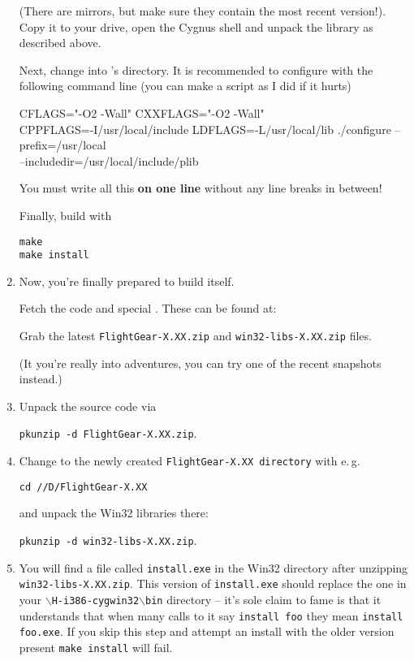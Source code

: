 \begin{enumerate}

(There are mirrors, but make sure they contain the most recent version!). Copy it to your
\FlightGear drive, open the Cygnus shell and unpack the library as described above.

Next, change into 's directory. It is recommended to configure 
with the following command line (you can make a script as I did if it hurts)

\begin{ttfamily}
CFLAGS="-O2 -Wall" CXXFLAGS="-O2 -Wall"\\ CPPFLAGS=-I/usr/local/include
LDFLAGS=-L/usr/local/lib ./configure
--prefix=/usr/local\\
 --includedir=/usr/local/include/plib
\end{ttfamily}

You must write all this \textbf{on one line} without any line breaks in between!

Finally, build  with

 \texttt{make}\\
 \texttt{make install}

\item Now, you're finally prepared to build \FlightGear itself.

 Fetch the \FlightGear code and special .  These
can be found at:



 \noindent
    Grab the latest \texttt{FlightGear-X.XX.zip} and
    \texttt{win32-libs-X.XX.zip} files.

(It you're really into adventures, you can try one of the recent snapshots instead.)

\item Unpack the \FlightGear source code via

        \texttt{pkunzip -d FlightGear-X.XX.zip}.

 \noindent

\item  Change to the newly created \texttt{FlightGear-X.XX directory} with e.\,g.

\texttt{cd //D/FlightGear-X.XX}

 and unpack the Win32 libraries there:

     \texttt{pkunzip -d win32-libs-X.XX.zip}.


\item  You will find a file called \texttt{install.exe} in the Win32
directory after unzipping \texttt{win32-libs-X.XX.zip}. This
version of \texttt{install.exe} should replace the one in your
$\backslash$\texttt{H-i386-cygwin32$\backslash$bin} directory --
it's sole claim to fame is that it understands that when many
calls to it say \texttt{install foo} they mean \texttt{install
foo.exe}. If you skip this step and attempt an install with the
older version present \texttt{make install} will fail.


\end{enumerate}
